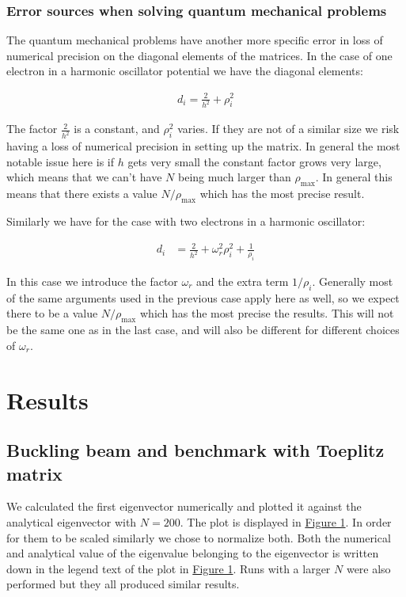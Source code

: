 \documentclass[reprint,english,notitlepage]{revtex4-1}  %
\begin{document}
\subsubsection{Error sources when solving quantum mechanical problems} \label{sec:III:b:i} 

The quantum mechanical problems have another more specific error in loss of numerical precision on the diagonal elements of the matrices. In the case of one electron in a harmonic oscillator potential we have the diagonal elements:

\begin{align*}
d_i = \frac{2}{h^2} + \rho_i^2
\end{align*}

The factor $\frac{2}{h^2}$ is a constant, and $\rho_i^2$ varies. If they are not of a similar size we risk having a loss of numerical precision in setting up the matrix. In general the most notable issue here is if $h$ gets very small the constant factor grows very large, which means that we can't have $N$ being much larger than $\rho_\text{max}$. In general this means that there exists a value $N/\rho_\text{max}$ which has the most precise result. 

Similarly we have for the case with two electrons in a harmonic oscillator:

\begin{align*}
d_i &= \frac{2}{h^2} + \omega_r^2 \rho_i^2 + \frac{1}{\rho_i}
\end{align*}

In this case we introduce the factor $\omega_r$ and the extra term $1/\rho_i$. Generally most of the same arguments used in the previous case apply here as well, so we expect there to be a value $N/\rho_\text{max}$ which has the most precise the results. This will not be the same one as in the last case, and will also be different for different choices of $\omega_r$. 

\newpage

\section{Results} \label{sec:IV}

\subsection{Buckling beam and benchmark with Toeplitz matrix} \label{sec:IV:a}

We calculated the first eigenvector numerically and plotted it against the analytical eigenvector with $N=200$. The plot is displayed in \hyperref[fig:IV:a:1]{Figure 1}. In order for them to be scaled similarly we chose to normalize both. Both the numerical and analytical value of the eigenvalue belonging to the eigenvector is written down in the legend text of the plot in \hyperref[fig:IV:a:1]{Figure 1}. Runs with a larger $N$ were also performed but they all produced similar results.
\end{document}
